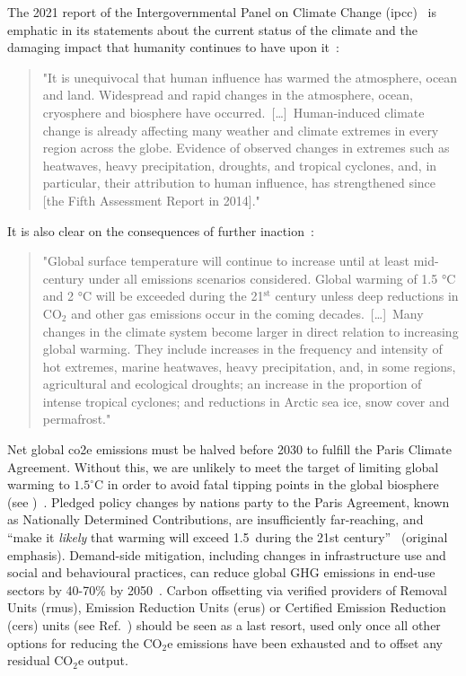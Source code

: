 \documentclass[../SustainableHEP.tex]{subfiles}
\begin{document}
The 2021 report of the Intergovernmental Panel on Climate Change (\acrshort{ipcc})~\cite{IPCC2021report} is emphatic in its statements about the current status of the climate and the damaging impact that humanity continues to have upon it~\cite{IPCC2021reportSPM}:
\begin{quotation}
"It is unequivocal that human influence has warmed the atmosphere, ocean and land. Widespread and rapid changes in the atmosphere, ocean, cryosphere and biosphere have occurred.\ [\dots]\ Human-induced climate change is already affecting many weather and climate extremes in every region 
across the globe. Evidence of observed changes in extremes such as heatwaves, heavy precipitation, droughts, 
and tropical cyclones, and, in particular, their attribution to human influence, has strengthened since [the Fifth Assessment Report in 2014]."
\end{quotation}
It is also clear on the consequences of further inaction~\cite{IPCC2021reportSPM}:
\begin{quotation}
"Global surface temperature will continue to increase until at least mid-century under all emissions scenarios
considered. Global warming of 1.5 °C and 2 °C will be exceeded during the 21$^\text{st}$ century unless deep reductions 
in $\mathrm{CO_2}$ and other  gas emissions occur in the coming decades.\ [\dots]\ Many changes in the climate system become larger in direct relation to increasing global warming. They 
include increases in the frequency and intensity of hot extremes, marine heatwaves, heavy precipitation, 
and, in some regions, agricultural and ecological droughts; an increase in the proportion of intense tropical 
cyclones; and reductions in Arctic sea ice, snow cover and permafrost."
\end{quotation}

Net global \acrshort{co2e} emissions must be halved before 2030 to fulfill the Paris Climate Agreement. Without this, we are unlikely to meet the  target of limiting global warming to $1.5^\circ$C in order to avoid fatal tipping points in the global biosphere (see )~\cite{IPCC19policy}. Pledged policy changes by nations party to the Paris Agreement, known as Nationally Determined Contributions, are insufficiently far-reaching, and ``make it {\it likely} that warming will exceed 1.5\degree\ during the 21st century''~\cite{IPCC2023SynthesisSPM} (original emphasis).  Demand-side mitigation, including changes in infrastructure use and social and behavioural practices, can reduce global GHG emissions in end-use sectors by 40-70\% by 2050~\cite{IPCC2022reportSPM}.  Carbon offsetting via verified providers of Removal Units (\acrshort{rmu}s), Emission Reduction Units (\acrshort{eru}s) or Certified Emission Reduction (\acrshort{cer}s) units (see Ref.~\cite{Uni22}) should be seen as a last resort, used only once all other options for reducing the CO$_2$e emissions have been exhausted and to offset any residual CO$_2$e output.  
\end{document}
